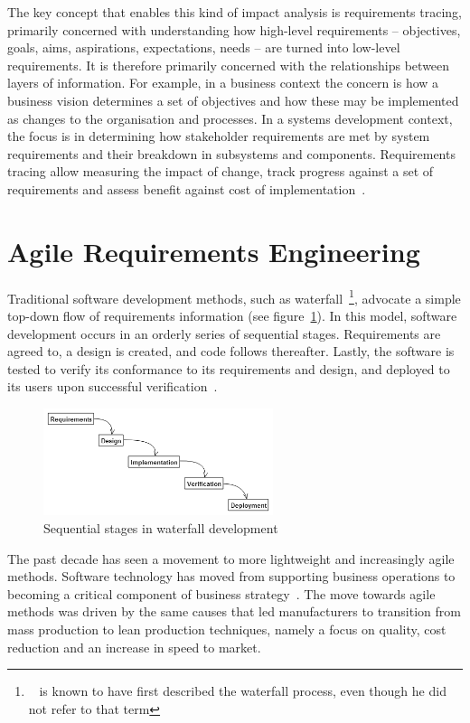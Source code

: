 \documentclass[dissertation,final]{softeng}
\begin{document}
The key concept that enables this kind of impact analysis is requirements tracing, primarily concerned with understanding how high-level requirements -- objectives, goals, aims, aspirations, expectations, needs -- are turned into low-level requirements. It is therefore primarily concerned with the relationships between layers of information. For example, in a business context the concern is how a business vision determines a set of objectives and how these may be implemented as changes to the organisation and processes. In a systems development context, the focus is in determining how stakeholder requirements are met by system requirements and their breakdown in subsystems and components. Requirements tracing allow measuring the impact of change, track progress against a set of requirements and assess benefit against cost of implementation~\citep{Hull2011}.

\section{Agile Requirements Engineering}
\label{sec:agile_requirements}
Traditional software development methods, such as waterfall~\footnote{~\citet{royce1970managing} is known to have first described the waterfall process, even though he did not refer to that term}, advocate a simple top-down flow of requirements information (see figure~\ref{fig:waterfall}). In this model, software development occurs in an orderly series of sequential stages. Requirements are agreed to, a design is created, and code follows thereafter. Lastly, the software is tested to verify its conformance to its requirements and design, and deployed to its users upon successful verification~\citep{Leffingwell2011}.

\begin{figure}[h!]
\includegraphics[width=0.60\textwidth]{waterfall2}
\centering
\caption[Sequential stages in waterfall development]{Sequential stages in waterfall development~\citep{Leffingwell2011}}
\label{fig:waterfall}
\end{figure}

The past decade has seen a movement to more lightweight and increasingly agile methods. Software technology has moved from supporting business operations to becoming a critical component of business strategy~\citep{Highsmith:2000:ASD:323922}. The move towards agile methods was driven by the same causes that led manufacturers to transition from mass production to lean production techniques, namely a focus on quality, cost reduction and an increase in speed to market.
\end{document}

